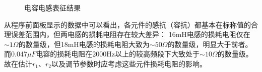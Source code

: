 \documentclass[12pt, a4paper]{ctexart}
\begin{document}
\begin{figure}
    \centering

    \vspace{-0.1in}

    \vspace{-0.1in}
    \caption{电容电感表征结果}
    \label{fig:4}
\end{figure}

从程序前面板显示的数据中可以看出，各元件的感抗（容抗）都基本在标称值的合理误差范围内，但两电感的损耗电阻存在较大差异：
16mH电感的损耗电阻仅在$\sim 1\Omega$的数量级，但18mH电感的损耗电阻大致为$\sim 50\Omega$的数量级，明显大于前者。
而0.047$\mu F$电容的损耗电阻在2000Hz以上的较高频段下大致处于$\sim 10\Omega$的数量级。
故在估计$r_1$、$r_2$以及调节参数时应考虑这些元件损耗电阻的影响。
\end{document}
